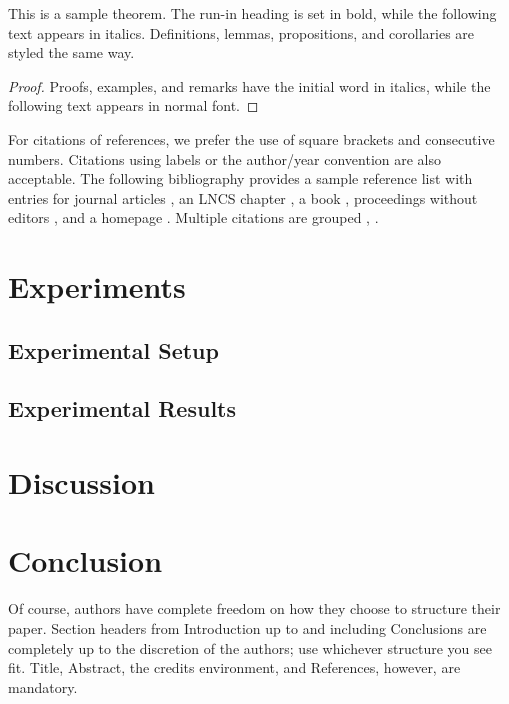 \documentclass[runningheads]{llncs}
\begin{document}
\begin{theorem}
This is a sample theorem. The run-in heading is set in bold, while
the following text appears in italics. Definitions, lemmas,
propositions, and corollaries are styled the same way.
\end{theorem}

\begin{proof}
Proofs, examples, and remarks have the initial word in italics,
while the following text appears in normal font.
\end{proof}

For citations of references, we prefer the use of square brackets and
consecutive numbers. Citations using labels or the author/year
convention are also acceptable. The following bibliography provides a
sample reference list with entries for journal articles
\cite{ref_article1}, an LNCS chapter \cite{ref_lncs1}, a book
\cite{ref_book1}, proceedings without editors \cite{ref_proc1}, and a
homepage \cite{ref_url1}. Multiple citations are grouped
\cite{ref_article1,ref_lncs1,ref_book1},
\cite{ref_article1,ref_book1,ref_proc1,ref_url1}.

\section{Experiments}\label{experiments}

\subsection{Experimental Setup}\label{experimental-setup}

\subsection{Experimental Results}\label{experimental-results}

\section{Discussion}\label{discussion}

\section{Conclusion}\label{conclusion}

Of course, authors have complete freedom on how they choose to structure
their paper. Section headers from Introduction up to and including
Conclusions are completely up to the discretion of the authors; use
whichever structure you see fit. Title, Abstract, the credits
environment, and References, however, are mandatory.
\end{document}

